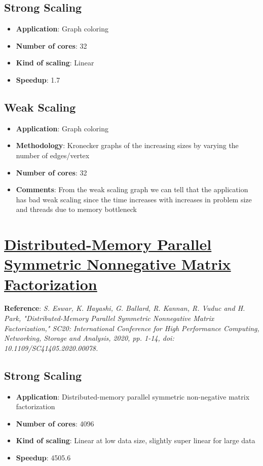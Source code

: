 \documentclass[11pt]{article}
\begin{document}
\subsection*{Strong Scaling}
\label{sec:orgb65e27b}
\begin{itemize}
\item \textbf{Application}: Graph coloring
\item \textbf{Number of cores}: 32
\item \textbf{Kind of scaling}: Linear
\item \textbf{Speedup}: 1.7
\end{itemize}

\subsection*{Weak Scaling}
\label{sec:orgbdf903a}
\begin{itemize}
\item \textbf{Application}: Graph coloring
\item \textbf{Methodology}: Kronecker graphs of the increasing sizes by varying the number of edges/vertex
\item \textbf{Number of cores}: 32
\item \textbf{Comments}:
From the weak scaling graph we can tell that the application has bad weak scaling since the time increases with increases in problem size and threads due to memory bottleneck
\end{itemize}

\pagebreak
\section{\href{https://ieeexplore.ieee.org/document/9355277}{Distributed-Memory Parallel Symmetric Nonnegative Matrix Factorization}}
\label{sec:org2901233}

\textbf{Reference}: \textit{S. Eswar, K. Hayashi, G. Ballard, R. Kannan, R. Vuduc and H. Park, "Distributed-Memory Parallel Symmetric Nonnegative Matrix Factorization," SC20: International Conference for High Performance Computing, Networking, Storage and Analysis, 2020, pp. 1-14, doi: 10.1109/SC41405.2020.00078.}

\subsection*{Strong Scaling}
\label{sec:org95ecc38}
\begin{itemize}
\item \textbf{Application}: Distributed-memory parallel symmetric non-negative matrix factorization
\item \textbf{Number of cores}: 4096
\item \textbf{Kind of scaling}: Linear at low data size, slightly super linear for large data
\item \textbf{Speedup}: 4505.6
\end{itemize}
\end{document}
